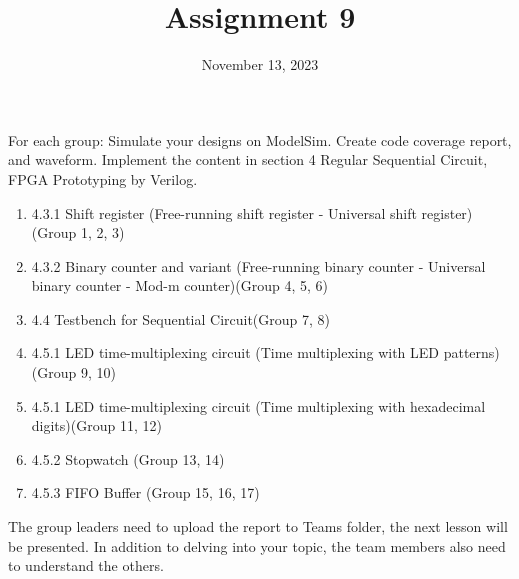 \documentclass{vhdl-assignment}
\title{Assignment 9}
\date{November 13, 2023}
\begin{document}
\maketitle
\thispagestyle{fancy}

For each group: Simulate your designs on ModelSim. Create code coverage report, and waveform.
Implement the content in section 4 Regular Sequential Circuit, FPGA Prototyping by Verilog.

\begin{enumerate}
    \item 4.3.1 Shift register (Free-running shift register - Universal shift register) (Group 1, 2, 3)
    \item 4.3.2 Binary counter and variant (Free-running binary counter - Universal binary counter - Mod-m counter)(Group 4, 5, 6)
    \item 4.4 Testbench for Sequential Circuit(Group 7, 8)
    \item 4.5.1 LED time-multiplexing circuit (Time multiplexing with LED patterns)(Group 9, 10)
    \item 4.5.1 LED time-multiplexing circuit (Time multiplexing with hexadecimal digits)(Group 11, 12)
    \item 4.5.2 Stopwatch (Group 13, 14)
    \item 4.5.3 FIFO Buffer (Group 15, 16, 17)
\end{enumerate}

The group leaders need to upload the report to Teams folder, the next lesson will be presented.
In addition to delving into your topic, the team members also need to understand the others.
\end{document}
